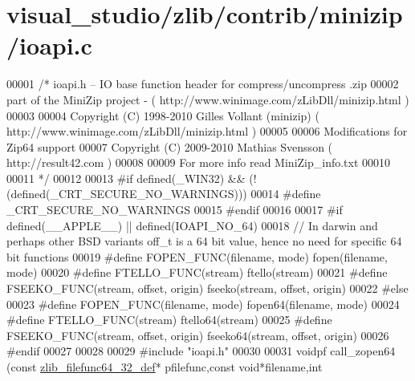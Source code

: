 \hypertarget{visual__studio_2zlib_2contrib_2minizip_2ioapi_8c_source}{}\section{visual\+\_\+studio/zlib/contrib/minizip/ioapi.c}
\label{visual__studio_2zlib_2contrib_2minizip_2ioapi_8c_source}

\begin{DoxyCode}
00001 \textcolor{comment}{/* ioapi.h -- IO base function header for compress/uncompress .zip}
00002 \textcolor{comment}{   part of the MiniZip project - ( http://www.winimage.com/zLibDll/minizip.html )}
00003 \textcolor{comment}{}
00004 \textcolor{comment}{         Copyright (C) 1998-2010 Gilles Vollant (minizip) ( http://www.winimage.com/zLibDll/minizip.html )}
00005 \textcolor{comment}{}
00006 \textcolor{comment}{         Modifications for Zip64 support}
00007 \textcolor{comment}{         Copyright (C) 2009-2010 Mathias Svensson ( http://result42.com )}
00008 \textcolor{comment}{}
00009 \textcolor{comment}{         For more info read MiniZip\_info.txt}
00010 \textcolor{comment}{}
00011 \textcolor{comment}{*/}
00012 
00013 \textcolor{preprocessor}{#if defined(\_WIN32) && (!(defined(\_CRT\_SECURE\_NO\_WARNINGS)))}
00014 \textcolor{preprocessor}{        #define \_CRT\_SECURE\_NO\_WARNINGS}
00015 \textcolor{preprocessor}{#endif}
00016 
00017 \textcolor{preprocessor}{#if defined(\_\_APPLE\_\_) || defined(IOAPI\_NO\_64)}
00018 \textcolor{comment}{// In darwin and perhaps other BSD variants off\_t is a 64 bit value, hence no need for specific 64 bit
       functions}
00019 \textcolor{preprocessor}{#define FOPEN\_FUNC(filename, mode) fopen(filename, mode)}
00020 \textcolor{preprocessor}{#define FTELLO\_FUNC(stream) ftello(stream)}
00021 \textcolor{preprocessor}{#define FSEEKO\_FUNC(stream, offset, origin) fseeko(stream, offset, origin)}
00022 \textcolor{preprocessor}{#else}
00023 \textcolor{preprocessor}{#define FOPEN\_FUNC(filename, mode) fopen64(filename, mode)}
00024 \textcolor{preprocessor}{#define FTELLO\_FUNC(stream) ftello64(stream)}
00025 \textcolor{preprocessor}{#define FSEEKO\_FUNC(stream, offset, origin) fseeko64(stream, offset, origin)}
00026 \textcolor{preprocessor}{#endif}
00027 
00028 
00029 \textcolor{preprocessor}{#include "ioapi.h"}
00030 
00031 voidpf call\_zopen64 (\textcolor{keyword}{const} \hyperlink{structzlib__filefunc64__32__def__s}{zlib\_filefunc64\_32\_def}* pfilefunc,\textcolor{keyword}{const} \textcolor{keywordtype}{void}*filename,\textcolor{keywordtype}{int} 

\end{DoxyCode}
